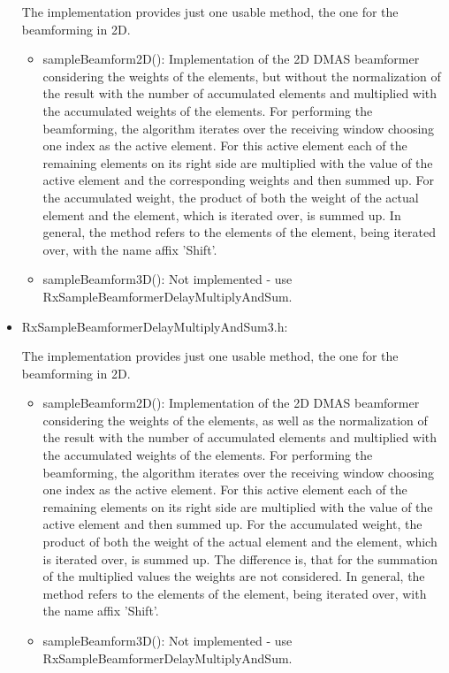 \documentclass[12pt,a4paper,oneside]{scrartcl}
\begin{document}
\begin{itemize}
    The implementation provides just one usable method, the one for the beamforming in 2D.
      \begin{itemize}
        \item sampleBeamform2D():
          Implementation of the 2D DMAS beamformer considering the weights of the elements, but without the normalization of the result with the number of accumulated elements and multiplied with the accumulated weights of the elements.
          For performing the beamforming, the algorithm iterates over the receiving window choosing one index as the active element.
          For this active element each of the remaining elements on its right side are multiplied with the value of the active element and the corresponding weights and then summed up.
          For the accumulated weight, the product of both the weight of the actual element and the element, which is iterated over, is summed up.
          In general, the method refers to the elements of the element, being iterated over, with the name affix 'Shift'.
        \item sampleBeamform3D():
          Not implemented - use RxSampleBeamformerDelayMultiplyAndSum.
      \end{itemize}

  \item RxSampleBeamformerDelayMultiplyAndSum3.h:

    The implementation provides just one usable method, the one for the beamforming in 2D.
      \begin{itemize}
        \item sampleBeamform2D():
          Implementation of the 2D DMAS beamformer considering the weights of the elements, as well as the normalization of the result with the number of accumulated elements and multiplied with the accumulated weights of the elements.
          For performing the beamforming, the algorithm iterates over the receiving window choosing one index as the active element.
          For this active element each of the remaining elements on its right side are multiplied with the value of the active element and then summed up.
          For the accumulated weight, the product of both the weight of the actual element and the element, which is iterated over, is summed up.
          The difference is, that for the summation of the multiplied values the weights are not considered.
          In general, the method refers to the elements of the element, being iterated over, with the name affix 'Shift'.
        \item sampleBeamform3D():
          Not implemented - use RxSampleBeamformerDelayMultiplyAndSum.
      \end{itemize}


\end{itemize}
\end{document}
